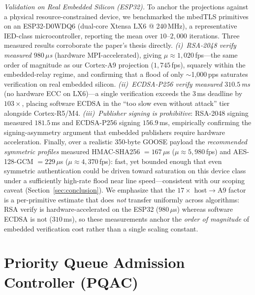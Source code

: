 \documentclass[journal]{IEEEtran}
\begin{document}
\textit{Validation on Real Embedded Silicon (ESP32).} To anchor the projections against a physical resource-constrained device, we benchmarked the mbedTLS primitives on an \mbox{ESP32-D0WDQ6} (dual-core Xtensa LX6 @ 240\,MHz), a representative IED-class microcontroller, reporting the mean over $10$--$2{,}000$ iterations. Three measured results corroborate the paper's thesis directly. \emph{(i)~RSA-2048 verify measured $980\,\mu$s} (hardware MPI-accelerated), giving $\mu \approx 1{,}020$\,fps---the same order of magnitude as our Cortex-A9 projection ($1{,}745$\,fps), squarely within the embedded-relay regime, and confirming that a flood of only $\sim$1{,}000\,pps saturates verification on real embedded silicon. \emph{(ii)~ECDSA-P256 verify measured $310.5$\,ms} (no hardware ECC on LX6)---a single verification exceeds the 3\,ms deadline by $103\times$, placing software ECDSA in the ``too slow even without attack'' tier alongside Cortex-R5/M4. \emph{(iii)~Publisher signing is prohibitive}: RSA-2048 signing measured $181.5$\,ms and ECDSA-P256 signing $156.9$\,ms, empirically confirming the signing-asymmetry argument that embedded publishers require hardware acceleration. Finally, over a realistic 350-byte GOOSE payload the \emph{recommended symmetric profiles} measured HMAC-SHA256 $=167\,\mu$s ($\mu \approx 5{,}980$\,fps) and AES-128-GCM $=229\,\mu$s ($\mu \approx 4{,}370$\,fps): fast, yet bounded enough that even symmetric authentication could be driven toward saturation on this device class under a sufficiently high-rate flood near line speed---consistent with our scoping caveat (Section~\ref{sec:conclusion}). We emphasize that the $17\times$ host$\to$A9 factor is a per-primitive estimate that does \emph{not} transfer uniformly across algorithms: RSA verify is hardware-accelerated on the ESP32 ($980\,\mu$s) whereas software ECDSA is not ($310$\,ms), so these measurements anchor the \emph{order of magnitude} of embedded verification cost rather than a single scaling constant.

\section{Priority Queue Admission Controller (PQAC)}
\label{sec:pqac}
\end{document}
